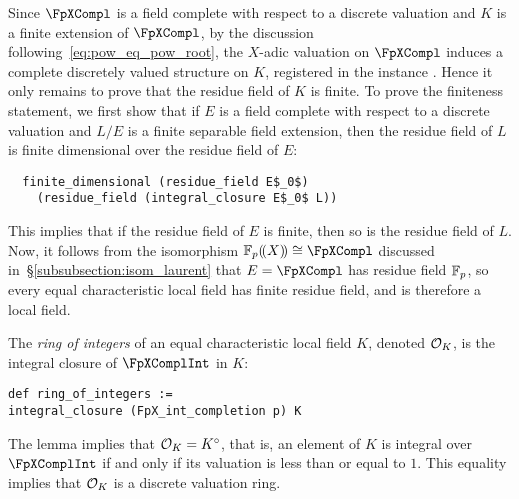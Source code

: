 \documentclass[sigplan,10pt,anonymous,review]{acmart}
\begin{document}
Since $\FpXCompl$ is a field complete with respect to a discrete valuation and $K$ is a finite extension of $\FpXCompl$, by the discussion following~\eqref{eq:pow_eq_pow_root}, the $X$-adic valuation on $\FpXCompl$ induces a complete\href{https://github.com/LCFT-Lean/local_fields/blob/76ad487d09babdb0018f394a5634526637ee014a/src/eq_characteristic/valuation.lean#L52}{\extlink} discretely\href{https://github.com/LCFT-Lean/local_fields/blob/76ad487d09babdb0018f394a5634526637ee014a/src/eq_characteristic/valuation.lean#L55}{\extlink} valued structure on $K$, registered in the instance \href{https://github.com/LCFT-Lean/local_fields/blob/76ad487d09babdb0018f394a5634526637ee014a/src/eq_characteristic/valuation.lean#L49}{\extlink}. Hence it only remains to prove that the residue field of $K$ is finite. To prove the finiteness statement, we first show that if $E$ is a field complete with respect to a discrete valuation and $L/E$ is a finite separable field extension, then the residue field of $L$ is finite dimensional over the residue field of $E$\href{https://github.com/LCFT-Lean/local_fields/blob/76ad487d09babdb0018f394a5634526637ee014a/src/discrete_valuation_ring/residue_field.lean#L373}{\extlink}:
\begin{lstlisting}
  finite_dimensional (residue_field E$_0$) 
    (residue_field (integral_closure E$_0$ L))
\end{lstlisting}
This implies that if the residue field of $E$ is finite, then so is the residue field of $L$. Now, it follows from the isomorphism $\laurentseries\cong\FpXCompl$ discussed in~\S\ref{subsubsection:isom_laurent} that $E=\FpXCompl$ has residue field $\mathbb{F}_{p}$, so every equal characteristic local field has finite residue field, and is therefore a local field.

The \emph{ring of integers} of an equal characteristic local field $K$, denoted $\mathcal{O}_{K}$, is the integral closure of $\FpXComplInt$ in $K$\href{https://github.com/LCFT-Lean/local_fields/blob/76ad487d09babdb0018f394a5634526637ee014a/src/eq_characteristic/basic.lean#L370}{\extlink}:
\begin{lstlisting}
def ring_of_integers := 
integral_closure (FpX_int_completion p) K
\end{lstlisting}
The lemma  implies that $\mathcal{O}_{K} = {K}^\circ$, that is, an element of $K$ is integral over $\FpXComplInt$ if and only if its valuation is less than or equal to $1$. This equality implies that $\mathcal{O}_{K}$ is a discrete valuation ring\href{https://github.com/LCFT-Lean/local_fields/blob/76ad487d09babdb0018f394a5634526637ee014a/src/eq_characteristic/valuation.lean#L59}{\extlink}.
\end{document}
